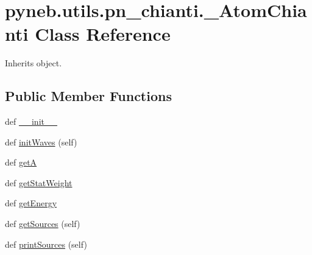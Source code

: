 \hypertarget{classpyneb_1_1utils_1_1pn__chianti_1_1___atom_chianti}{}\section{pyneb.\+utils.\+pn\+\_\+chianti.\+\_\+\+Atom\+Chianti Class Reference}
\label{classpyneb_1_1utils_1_1pn__chianti_1_1___atom_chianti}


Inherits object.

\subsection*{Public Member Functions}
\begin{DoxyCompactItemize}
\item 
def \hyperlink{classpyneb_1_1utils_1_1pn__chianti_1_1___atom_chianti_accfb95c4b9bdc734c43e40cc5d21c5c1}{\+\_\+\+\_\+init\+\_\+\+\_\+}
\item 
def \hyperlink{classpyneb_1_1utils_1_1pn__chianti_1_1___atom_chianti_af8bfc64a36028b1802d6d7be9ef7301f}{init\+Waves} (self)
\item 
def \hyperlink{classpyneb_1_1utils_1_1pn__chianti_1_1___atom_chianti_aed967b738fd8c3d9ebef843f71d7063e}{get\+A}
\item 
def \hyperlink{classpyneb_1_1utils_1_1pn__chianti_1_1___atom_chianti_a6a02beb861a01f6349a3cd87681491f0}{get\+Stat\+Weight}
\item 
def \hyperlink{classpyneb_1_1utils_1_1pn__chianti_1_1___atom_chianti_adfaee032bacec747d8a1573968d0ebf1}{get\+Energy}
\item 
def \hyperlink{classpyneb_1_1utils_1_1pn__chianti_1_1___atom_chianti_ac7618cb5d81b716d41b44c632867c2d8}{get\+Sources} (self)
\item 
def \hyperlink{classpyneb_1_1utils_1_1pn__chianti_1_1___atom_chianti_a9e704e6c8efaee3738beabf302cf33e1}{print\+Sources} (self)
\end{DoxyCompactItemize}
